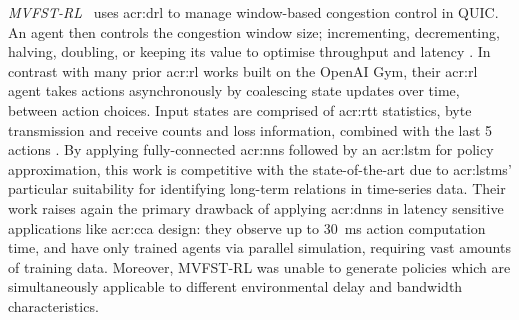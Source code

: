 \emph{MVFST-RL}~\parencite{DBLP:journals/corr/abs-1910-04054} uses \gls{acr:drl} to manage window-based congestion control in QUIC.
An agent then controls the congestion window size; incrementing, decrementing, halving, doubling, or keeping its value \prllitact{} to optimise throughput and latency \prllitreward.
In contrast with many prior \gls{acr:rl} works built on the OpenAI Gym, their \gls{acr:rl} agent takes actions asynchronously by coalescing state updates over time, between action choices.
Input states are comprised of \gls{acr:rtt} statistics, byte transmission and receive counts and loss information, combined with the last \num{5} actions \prllitstate.
By applying fully-connected \glspl{acr:nn} followed by an \gls{acr:lstm} for policy approximation, this work is competitive with the state-of-the-art due to \glspl{acr:lstm}' particular suitability for identifying long-term relations in time-series data.
Their work raises again the primary drawback of applying \glspl{acr:dnn} in latency sensitive applications like \gls{acr:cca} design: they observe up to \qty{30}{\milli\second} action computation time, and have only trained agents via parallel simulation, requiring vast amounts of training data.
Moreover, MVFST-RL was unable to generate policies which are simultaneously applicable to different environmental delay and bandwidth characteristics.


